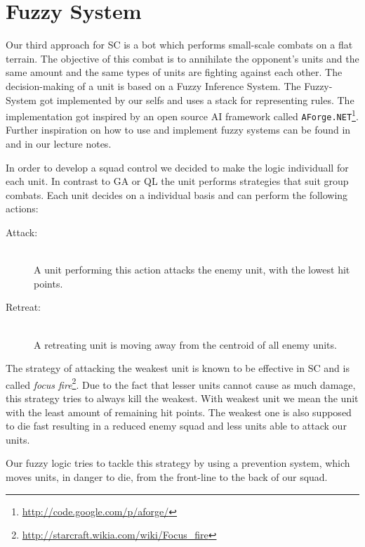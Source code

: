 \section{Fuzzy System}
\label{sec:fuzzy}
Our third approach for SC is a bot which performs small-scale combats on a flat terrain. The objective of this combat is to annihilate the opponent's units and the same amount and the same types of units are fighting against each other.
The decision-making of a unit is based on a Fuzzy Inference System.
The Fuzzy-System got implemented by our selfs and uses a stack for representing rules. The implementation got inspired by an open source AI framework called {\tt AForge.NET}\footnote{\url{http://code.google.com/p/aforge/}}.  %
Further inspiration on how to use and implement fuzzy systems can be found in \cite{gpuGems2_fuzzy} and in our lecture notes.

In order to develop a squad control we decided to make the logic individuall for each unit. In contrast to GA or QL the unit performs strategies that suit group combats. Each unit decides on a individual basis and can perform the following actions:
\begin{description}
	\item[Attack:] \hfill \\
A unit performing this action attacks the enemy unit, with the lowest hit points.
	\item[Retreat:] \hfill \\
A retreating unit is moving away from the centroid of all enemy units.
\end{description}
The strategy of attacking the weakest unit is known to be effective in SC and is called \emph{focus fire}\footnote{\url{http://starcraft.wikia.com/wiki/Focus_fire}}. %
Due to the fact that lesser units cannot cause as much damage, this strategy tries to always kill the weakest. With weakest unit we mean the unit with the least amount of remaining hit points. The weakest one is also supposed to die fast resulting in a reduced enemy squad and less units able to attack our units. 

Our fuzzy logic tries to tackle this strategy by using a prevention system, which moves units, in danger to die, from the front-line to the back of our squad.

